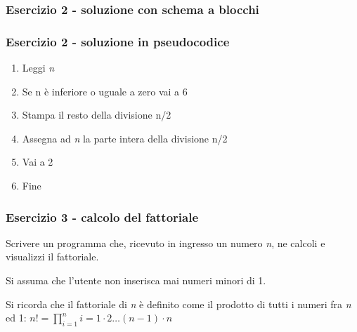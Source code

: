 \documentclass[handout]{beamer}
\begin{document}
\begin{frame}
\frametitle{Esercizio 2 - soluzione con schema a blocchi}
\centering
{}
\end{frame}

\begin{frame}
\frametitle{Esercizio 2 - soluzione in pseudocodice}
\begin{enumerate}
	\item Leggi \emph{n}
	\item Se n è inferiore o uguale a zero vai a 6
	\item Stampa il resto della divisione n/2
	\item Assegna ad \emph{n} la parte intera della divisione n/2
	\item Vai a 2
	\item Fine
\end{enumerate}
\end{frame}

\begin{frame}
\frametitle{Esercizio 3 - calcolo del fattoriale}
Scrivere un programma che, ricevuto in ingresso un numero \emph{n}, ne calcoli e visualizzi il fattoriale.

Si assuma che l'utente non inserisca mai numeri minori di 1.

Si ricorda che il fattoriale di \emph{n} è definito come il prodotto di tutti i numeri fra \emph{n} ed 1: $n! = \prod_{i=1}^{n}i = 1 \cdot 2 \dots (n-1) \cdot n$
\end{frame}
\end{document}
